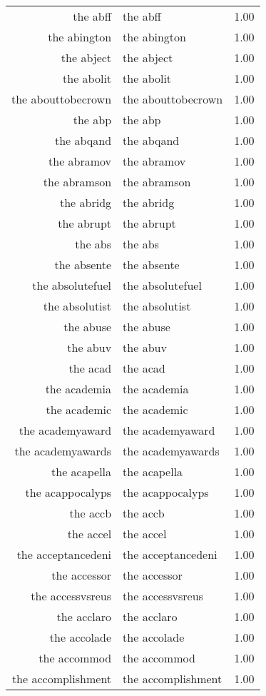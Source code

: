 \begin{table}[ht]
\begin{tabular}{rlr}
  the abff & the abff & 1.00 \\ 
  the abington & the abington & 1.00 \\ 
  the abject & the abject & 1.00 \\ 
  the abolit & the abolit & 1.00 \\ 
  the abouttobecrown & the abouttobecrown & 1.00 \\ 
  the abp & the abp & 1.00 \\ 
  the abqand & the abqand & 1.00 \\ 
  the abramov & the abramov & 1.00 \\ 
  the abramson & the abramson & 1.00 \\ 
  the abridg & the abridg & 1.00 \\ 
  the abrupt & the abrupt & 1.00 \\ 
  the abs & the abs & 1.00 \\ 
  the absente & the absente & 1.00 \\ 
  the absolutefuel & the absolutefuel & 1.00 \\ 
  the absolutist & the absolutist & 1.00 \\ 
  the abuse & the abuse & 1.00 \\ 
  the abuv & the abuv & 1.00 \\ 
  the acad & the acad & 1.00 \\ 
  the academia & the academia & 1.00 \\ 
  the academic & the academic & 1.00 \\ 
  the academyaward & the academyaward & 1.00 \\ 
  the academyawards & the academyawards & 1.00 \\ 
  the acapella & the acapella & 1.00 \\ 
  the acappocalyps & the acappocalyps & 1.00 \\ 
  the accb & the accb & 1.00 \\ 
  the accel & the accel & 1.00 \\ 
  the acceptancedeni & the acceptancedeni & 1.00 \\ 
  the accessor & the accessor & 1.00 \\ 
  the accessvsreus & the accessvsreus & 1.00 \\ 
  the acclaro & the acclaro & 1.00 \\ 
  the accolade & the accolade & 1.00 \\ 
  the accommod & the accommod & 1.00 \\ 
  the accomplishment & the accomplishment & 1.00 \\ 

\end{tabular}
\end{table}
